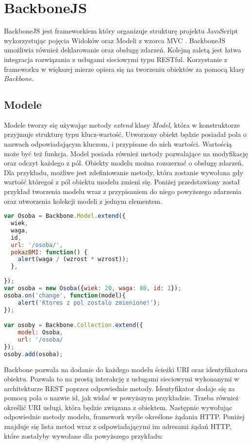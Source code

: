 \section{BackboneJS}
BackboneJS jest frameworkiem który organizuje strukturę projektu JavaScript wykorzystując pojęcia Widoków oraz Modeli z wzorca MVC \cite{backbonejs}. BackboneJS umożliwia również deklarowanie oraz obsługę zdarzeń. Kolejną zaletą jest łatwa integracja rozwiązania z usługami sieciowymi typu RESTful. Korzystanie z frameworku w większej mierze opiera się na tworzeniu obiektów za pomocą klasy \textit{Backbone}.

\subsection{Modele}
Modele tworzy się używając metody \textit{extend} klasy \textit{Model}, która w konstruktorze przyjmuje strukturę typu klucz-wartość. Utworzony obiekt będzie posiadał pola o nazwach odpowiadającym kluczom, i przypisane do nich wartości. Wartością może być też funkcja. 
Model posiada również metody pozwalające na modyfikację oraz odczyt każdego z pól. Obiekty modelu można rozszerzać o obsługę zdarzeń. Dla przykładu, możliwe jest zdefiniowanie metody, która zostanie wywołana gdy wartość któregoś z pól obiektu modelu zmieni się. 
Poniżej przedstawiony został przykład tworzenia modelu wraz z przypisaniem do niego powyższego zdarzenia oraz utworzenia kolekcji modeli z jednym elementem.
\begin{lstlisting}[language=JavaScript]
var Osoba = Backbone.Model.extend({
  wiek,
  waga,
  id,
  url: '/osoba/',
  pokazBMI: function() {
  	alert(waga / (wzrost * wzrost));
  },
  
});
var osoba = new Osoba({wiek: 20, waga: 80, id: 1});
osoba.on('change', function(model){
	alert('Ktores z pol zostalo zmienione!');
});

var osoby = Backbone.Collection.extend({
	model: Osoba,
	url: '/osoba/
});
osoby.add(osoba);
\end{lstlisting}

Backbone pozwala na dodanie do każdego modelu ścieżki URI oraz identyfikatora obiektu. Pozwala to na prostą interakcję z usługami sieciowymi wykonanymi w architekturze REST poprzez odpowiednie metody. Identyfikator dodaje się za pomocą pola o nazwie id, jak widać w powyższym przykładzie. Trzeba również określić URI usługi, która będzie związana z obiektem. Następnie wywołując odpowiednie metody modelu, framework wyśle określone żądania HTTP. Poniżej znajduje się lista metod wraz z odpowiadającymi im adresami żądań HTTP, które zostałyby wywołane dla powyższego przykładu:

